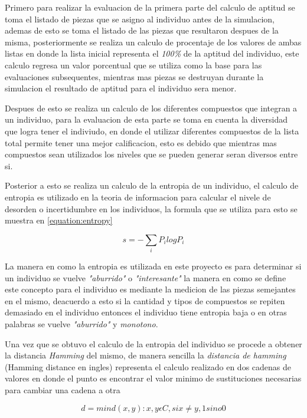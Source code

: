Primero para realizar la evaluacion de la primera parte del calculo de aptitud
se toma el listado de piezas que se asigno al individuo antes de la simulacion,
ademas de esto se toma el listado de las piezas que resultaron despues de la
misma, posteriormente se realiza un calculo de procentaje de los valores de
ambas listas en donde la lista inicial representa el \textit{100\%} de la
aptitud del individuo, este calculo regresa un valor porcentual que se utiliza
como la base para las evaluaciones subsequentes, mientras mas piezas se
destruyan durante la simulacion el resultado de aptitud para el individuo sera
menor.

Despues de esto se realiza un calculo de los diferentes compuestos que integran
a un individuo, para la evaluacion de esta parte se toma en cuenta la diversidad
que logra tener el indiviudo, en donde el utilizar diferentes compuestos de la
lista total permite tener una mejor calificacion, esto es debido que mientras
mas compuestos sean utilizados los niveles que se pueden generar seran diversos
entre si.

Posterior a esto se realiza un calculo de la entropia de un individuo, el
calculo de entropia es utilizado en la teoria de informacion para calcular el
nivele de desorden o incertidumbre en los individuos, la formula que se utiliza
para esto se muestra en \ref{equation:entropy}

\begin{equation}
  s = -\sum_i P_i log P_i
  \label{equation:entropy}
\end{equation}

La manera en como la entropia es utilizada en este proyecto es para determinar
si un individuo se vuelve \textit{"aburrido"} o \textit{"interesante"} la manera
en como se define este concepto para el individuo es mediante la medicion de las
piezas semejantes en el mismo, deacuerdo a esto si la cantidad y tipos de
compuestos se repiten demasiado en el individuo entonces el individuo tiene
entropia baja o en otras palabras se vuelve \textit{"aburrido"} y
\textit{monotono}.

Una vez que se obtuvo el calculo de la entropia del individuo se procede a
obtener la distancia \textit{Hamming} del mismo, de manera sencilla la
\textit{distancia de hamming} (Hamming distance en ingles) representa el calculo
realizado en dos cadenas de valores en donde el punto es encontrar el valor
minimo de sustituciones necesarias para cambiar una cadena a otra


\begin{equation}
  d = min{ d(x, y) : x, y \epsilon C, si x \neq y, 1 sino 0}
  \label{equation:hamming}
\end{equation}


